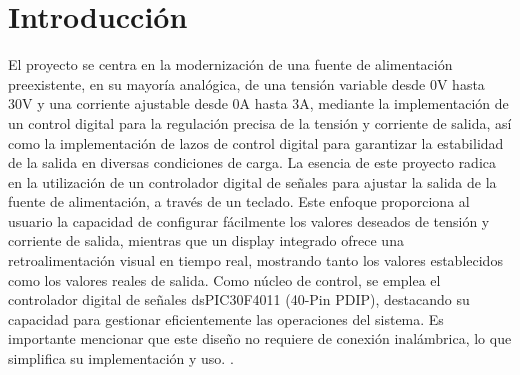   \chapter{Introducción}

\label{C:introduccion}

El proyecto se centra en la modernización de una fuente de alimentación preexistente, en su mayoría analógica, de una tensión variable desde 0V hasta 30V y una corriente ajustable desde 0A hasta 3A, mediante la implementación de un control digital para la regulación precisa de la tensión y corriente de salida, así como la implementación de lazos de control digital para garantizar la estabilidad de la salida en diversas condiciones de carga. 
La esencia de este proyecto radica en la utilización de un controlador digital de señales para ajustar la salida de la fuente de alimentación, a través de un teclado. Este enfoque proporciona al usuario la capacidad de configurar fácilmente los valores deseados de tensión y corriente de salida, mientras que un display integrado ofrece una retroalimentación visual en tiempo real, mostrando tanto los valores establecidos como los valores reales de salida.
Como núcleo de control, se emplea el controlador digital de señales dsPIC30F4011 (40-Pin PDIP), destacando su capacidad para gestionar eficientemente las operaciones del sistema. Es importante mencionar que este diseño no requiere de conexión inalámbrica, lo que simplifica su implementación y uso.
 \cite{plantilla_universidad_de_costa_rica}.



